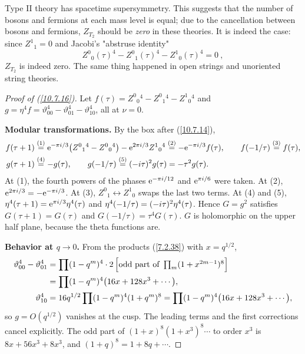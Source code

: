 	Type II theory has spacetime supersymmetry. This suggests that the number of bosons and fermions at each mass level is equal; due to the cancellation between bosons and fermions, $Z_{T_{2}}$ should be \emph{zero} in these theories. It is indeed the case: since $Z^{1}{}_{1}=0$ and Jacobi's "abstruse identity"
	\begin{equation}
		Z^{0}{}_{0}(\tau)^{4}-Z^{0}{}_{1}(\tau)^{4}-Z^{1}{}_{0}(\tau)^{4}=0 \:,\label{10.7.16}
	\end{equation}
	$Z_{T_{2}}$ is indeed zero. The same thing happened in open strings and unoriented string theories.
	\begin{tcolorbox}[breakable]
		\begin{proof}[Proof of (\ref{10.7.16})]
			Let $f(\tau)=Z^0{}_0{}^{4}-Z^0{}_1{}^{4}-Z^1{}_0{}^{4}$ and $g=\eta^{4}f=\vartheta_{00}^{4}-\vartheta_{01}^{4}-\vartheta_{10}^{4}$, all at $\nu=0$.

			\textbf{Modular transformations.} By the box after (\ref{10.7.14}),
			\begin{align*}
				f(\tau+1)&\overset{(1)}{=}\mathrm{e}^{-\pi i/3}\bigl(Z^0{}_1{}^{4}-Z^0{}_0{}^{4}\bigr)-\mathrm{e}^{2\pi i/3}Z^1{}_0{}^{4}\overset{(2)}{=}-\mathrm{e}^{-\pi i/3}f(\tau),\qquad
				f(-1/\tau)\overset{(3)}{=}f(\tau),\\
				g(\tau+1)&\overset{(4)}{=}-g(\tau),\qquad g(-1/\tau)\overset{(5)}{=}(-i\tau)^{2}g(\tau)=-\tau^{2}g(\tau) .
			\end{align*}
			At (1), the fourth powers of the phases $\mathrm{e}^{-\pi i/12}$ and $\mathrm{e}^{\pi i/6}$ were taken. At (2), $\mathrm{e}^{2\pi i/3}=-\mathrm{e}^{-\pi i/3}$. At (3), $Z^0{}_1\leftrightarrow Z^1{}_0$ swaps the last two terms. At (4) and (5), $\eta^{4}(\tau+1)=\mathrm{e}^{\pi i/3}\eta^{4}(\tau)$ and $\eta^{4}(-1/\tau)=(-i\tau)^{2}\eta^{4}(\tau)$. Hence $G=g^{2}$ satisfies $G(\tau+1)=G(\tau)$ and $G(-1/\tau)=\tau^{4}G(\tau)$. $G$ is holomorphic on the upper half plane, because the theta functions are.

			\textbf{Behavior at $q\to0$.} From the products (\ref{7.2.38}) with $x=q^{1/2}$,
			\begin{align*}
				\vartheta_{00}^{4}-\vartheta_{01}^{4}&=\prod(1-q^m)^{4}\cdot2\,\Bigl[\text{odd part of }\textstyle\prod_m(1+x^{2m-1})^{8}\Bigr]\\
				&=\prod(1-q^m)^{4}\bigl(16x+128x^{3}+\cdots\bigr),\\
				\vartheta_{10}^{4}&=16q^{1/2}\prod(1-q^m)^{4}(1+q^m)^{8}=\prod(1-q^m)^{4}\bigl(16x+128x^{3}+\cdots\bigr),
			\end{align*}
			so $g=O(q^{1/2})$ vanishes at the cusp. The leading terms and the first corrections cancel explicitly. The odd part of $(1+x)^{8}(1+x^{3})^{8}\cdots$ to order $x^{3}$ is $8x+56x^{3}+8x^{3}$, and $(1+q)^{8}=1+8q+\cdots$.


\end{proof}
\end{tcolorbox}
